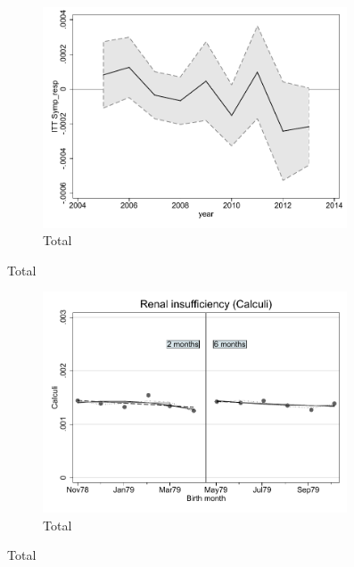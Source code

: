 \documentclass[a4paper ]{article}
\begin{document}
\begin{figure}[h!]
	\centering
	\begin{subfigure}[t]{0.5\textwidth}
		\centering
		\includegraphics[width=0.99\textwidth]{R1_LC_Symp_resp}
		\caption{Total}		
	\end{subfigure}
\end{figure}
\newpage
\begin{figure}[h]
	\centering
	\begin{subfigure}[t]{0.5\textwidth}
		\centering
		\includegraphics[width=0.99\textwidth]{R1_RD_Calculi_fits}
		\caption{Total}		
	\end{subfigure}
\end{figure}
\end{document}
